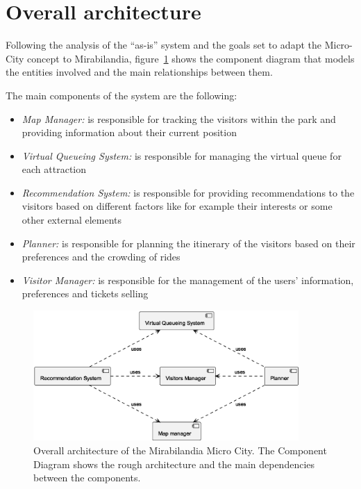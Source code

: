 \section{Overall architecture}\label{sec:mira-microcity}
Following the analysis of the ``as-is'' system and the goals set to adapt the Micro-City concept to Mirabilandia,
figure~\ref{fig:architecture-overview} shows the component diagram that models the entities involved and the main relationships between them.

The main components of the system are the following:

\begin{itemize}
	\item \textit{Map Manager:} is responsible for tracking the visitors within the park and providing information about their current position
	\item \textit{Virtual Queueing System:} is responsible for managing the virtual queue for each attraction
	\item \textit{Recommendation System:} is responsible for providing recommendations to the visitors based on different factors like for example their interests or some other external elements
	\item \textit{Planner:} is responsible for planning the itinerary of the visitors based on their preferences and the crowding of rides
	\item \textit{Visitor Manager:} is responsible for the management of the users' information, preferences and tickets selling
\end{itemize}

\begin{figure}[H]
	\centering
	\includegraphics[width=0.9\textwidth]{img/architecture-overview.eps}
	\caption{Overall architecture of the Mirabilandia Micro City.
		The Component Diagram shows the rough architecture and the main dependencies between the components.
	}
	\label{fig:architecture-overview}
\end{figure}

